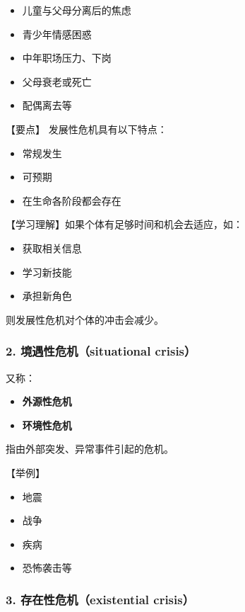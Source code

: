 \documentclass[
  chinese,
  9pt,
  a4paper,
]{ctexart}
\providecommand{\tightlist}{%
  \setlength{\itemsep}{0pt}\setlength{\parskip}{0pt}}
\begin{document}
\begin{itemize}
\tightlist
\item
  儿童与父母分离后的焦虑
\item
  青少年情感困惑
\item
  中年职场压力、下岗
\item
  父母衰老或死亡
\item
  配偶离去等
\end{itemize}

【要点】 发展性危机具有以下特点：

\begin{itemize}
\tightlist
\item
  常规发生
\item
  可预期
\item
  在生命各阶段都会存在
\end{itemize}

【学习理解】如果个体有足够时间和机会去适应，如：

\begin{itemize}
\tightlist
\item
  获取相关信息
\item
  学习新技能
\item
  承担新角色
\end{itemize}

则发展性危机对个体的冲击会减少。

\subsubsection{2. 境遇性危机（situational
crisis）}\label{ux5883ux9047ux6027ux5371ux673asituational-crisis}

又称：

\begin{itemize}
\tightlist
\item
  \textbf{外源性危机}
\item
  \textbf{环境性危机}
\end{itemize}

指由外部突发、异常事件引起的危机。

【举例】

\begin{itemize}
\tightlist
\item
  地震
\item
  战争
\item
  疾病
\item
  恐怖袭击等
\end{itemize}

\subsubsection{3. 存在性危机（existential
crisis）}\label{ux5b58ux5728ux6027ux5371ux673aexistential-crisis}
\end{document}
